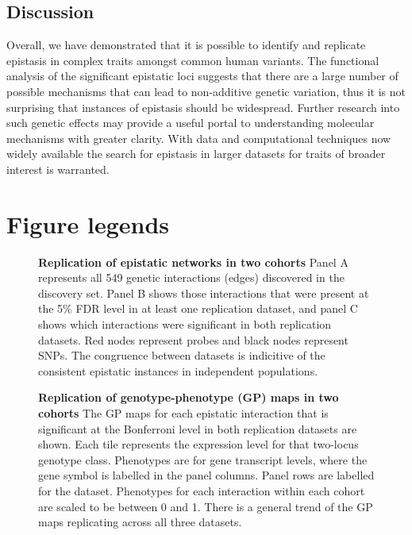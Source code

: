 \documentclass{article}
\begin{document}
\subsection{Discussion}
Overall, we have demonstrated that it is possible to identify and replicate epistasis in complex traits amongst common human variants. The functional analysis of the significant epistatic loci suggests that there are a large number of possible mechanisms that can lead to non-additive genetic variation, thus it is not surprising that instances of epistasis should be widespread. Further research into such genetic effects may provide a useful portal to understanding molecular mechanisms with greater clarity. With data and computational techniques now widely available the search for epistasis in larger datasets for traits of broader interest is warranted.



\clearpage
\section{Figure legends}

\begin{figure}[H]
	\caption{\textbf{Replication of epistatic networks in two cohorts} Panel A represents all 549 genetic interactions (edges) discovered in the discovery set. Panel B shows those interactions that were present at the 5\% FDR level in at least one replication dataset, and panel C shows which interactions were significant in both replication datasets. Red nodes represent probes and black nodes represent SNPs. The congruence between datasets is indicitive of the consistent epistatic instances in independent populations.}
	\label{fig:fireworks}
\end{figure}

\begin{figure}[H]
	\caption{\textbf{Replication of genotype-phenotype (GP) maps in two cohorts} The GP maps for each epistatic interaction that is significant at the Bonferroni level in both replication datasets are shown. Each tile represents the expression level for that two-locus genotype class. Phenotypes are for gene transcript levels, where the gene symbol is labelled in the panel columns. Panel rows are labelled for the dataset. Phenotypes for each interaction within each cohort are scaled to be between 0 and 1. There is a general trend of the GP maps replicating across all three datasets.}
	\label{fig:gpmaps}
\end{figure}
\end{document}
